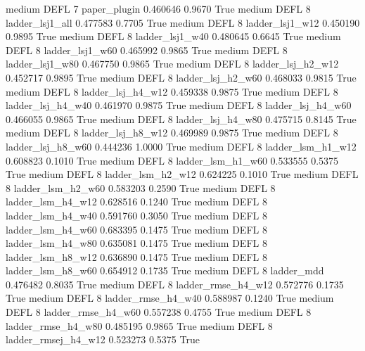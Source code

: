     medium     DEFL                 7        paper_plugin   0.460646      0.9670    True
    medium     DEFL                 8     ladder_lsj1_all   0.477583      0.7705    True
    medium     DEFL                 8     ladder_lsj1_w12   0.450190      0.9895    True
    medium     DEFL                 8     ladder_lsj1_w40   0.480645      0.6645    True
    medium     DEFL                 8     ladder_lsj1_w60   0.465992      0.9865    True
    medium     DEFL                 8     ladder_lsj1_w80   0.467750      0.9865    True
    medium     DEFL                 8   ladder_lsj_h2_w12   0.452717      0.9895    True
    medium     DEFL                 8   ladder_lsj_h2_w60   0.468033      0.9815    True
    medium     DEFL                 8   ladder_lsj_h4_w12   0.459338      0.9875    True
    medium     DEFL                 8   ladder_lsj_h4_w40   0.461970      0.9875    True
    medium     DEFL                 8   ladder_lsj_h4_w60   0.466055      0.9865    True
    medium     DEFL                 8   ladder_lsj_h4_w80   0.475715      0.8145    True
    medium     DEFL                 8   ladder_lsj_h8_w12   0.469989      0.9875    True
    medium     DEFL                 8   ladder_lsj_h8_w60   0.444236      1.0000    True
    medium     DEFL                 8   ladder_lsm_h1_w12   0.608823      0.1010    True
    medium     DEFL                 8   ladder_lsm_h1_w60   0.533555      0.5375    True
    medium     DEFL                 8   ladder_lsm_h2_w12   0.624225      0.1010    True
    medium     DEFL                 8   ladder_lsm_h2_w60   0.583203      0.2590    True
    medium     DEFL                 8   ladder_lsm_h4_w12   0.628516      0.1240    True
    medium     DEFL                 8   ladder_lsm_h4_w40   0.591760      0.3050    True
    medium     DEFL                 8   ladder_lsm_h4_w60   0.683395      0.1475    True
    medium     DEFL                 8   ladder_lsm_h4_w80   0.635081      0.1475    True
    medium     DEFL                 8   ladder_lsm_h8_w12   0.636890      0.1475    True
    medium     DEFL                 8   ladder_lsm_h8_w60   0.654912      0.1735    True
    medium     DEFL                 8          ladder_mdd   0.476482      0.8035    True
    medium     DEFL                 8  ladder_rmse_h4_w12   0.572776      0.1735    True
    medium     DEFL                 8  ladder_rmse_h4_w40   0.588987      0.1240    True
    medium     DEFL                 8  ladder_rmse_h4_w60   0.557238      0.4755    True
    medium     DEFL                 8  ladder_rmse_h4_w80   0.485195      0.9865    True
    medium     DEFL                 8 ladder_rmsej_h4_w12   0.523273      0.5375    True
